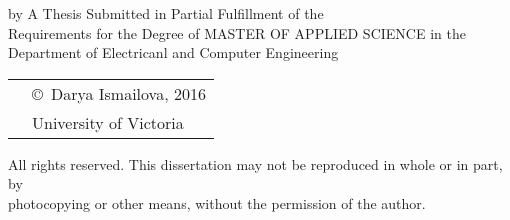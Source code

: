 \pagebreak
{
\centering
\thesistitle
\tpbreak
by
\tpbreak
\nameanddegrees
\tpbreak
A Thesis Submitted in Partial Fulfillment of the \\
Requirements for the Degree of
\tpbreak
MASTER OF APPLIED SCIENCE
\tpbreak
in the Department of Electricanl and Computer Engineering\\
\vfill
\begin{tabular}{cl}
& \copyright\ Darya Ismailova, 2016\\
& \phantom{\copyright} University of Victoria
\end{tabular}
\tpbreak
All rights reserved. This dissertation may not be reproduced in whole or in part, by \\
\hfill photocopying or other means, without the permission of the author. 
\hfill
}
\pagebreak
